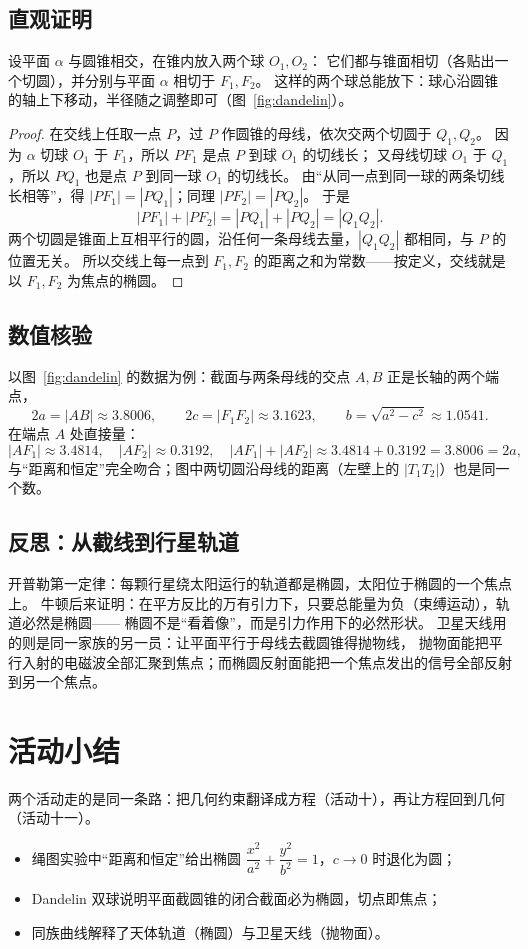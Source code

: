 \subsection{直观证明}
设平面 $\alpha$ 与圆锥相交，在锥内放入两个球 $O_1,O_2$：
它们都与锥面相切（各贴出一个切圆），并分别与平面 $\alpha$ 相切于 $F_1,F_2$。
这样的两个球总能放下：球心沿圆锥的轴上下移动，半径随之调整即可（图~\ref{fig:dandelin}）。

\begin{proof}
在交线上任取一点 $P$，过 $P$ 作圆锥的母线，依次交两个切圆于 $Q_1,Q_2$。
因为 $\alpha$ 切球 $O_1$ 于 $F_1$，所以 $PF_1$ 是点 $P$ 到球 $O_1$ 的切线长；
又母线切球 $O_1$ 于 $Q_1$，所以 $PQ_1$ 也是点 $P$ 到同一球 $O_1$ 的切线长。
由“从同一点到同一球的两条切线长相等”，得 $|PF_1|=|PQ_1|$；同理 $|PF_2|=|PQ_2|$。
于是
\[
  |PF_1|+|PF_2|=|PQ_1|+|PQ_2|=|Q_1Q_2|.
\]
两个切圆是锥面上互相平行的圆，沿任何一条母线去量，$|Q_1Q_2|$ 都相同，与 $P$ 的位置无关。
所以交线上每一点到 $F_1,F_2$ 的距离之和为常数——按定义，交线就是以 $F_1,F_2$ 为焦点的椭圆。
\end{proof}

\subsection{数值核验}
以图~\ref{fig:dandelin} 的数据为例：截面与两条母线的交点 $A,B$ 正是长轴的两个端点，
\[
  2a=|AB|\approx3.8006,\qquad 2c=|F_1F_2|\approx3.1623,\qquad
  b=\sqrt{a^2-c^2}\approx1.0541.
\]
在端点 $A$ 处直接量：
\[
  |AF_1|\approx3.4814,\quad |AF_2|\approx0.3192,\quad
  |AF_1|+|AF_2|\approx3.4814+0.3192=3.8006=2a,
\]
与“距离和恒定”完全吻合；图中两切圆沿母线的距离（左壁上的 $|T_1T_2|$）也是同一个数。

\subsection{反思：从截线到行星轨道}
开普勒第一定律：每颗行星绕太阳运行的轨道都是椭圆，太阳位于椭圆的一个焦点上。
牛顿后来证明：在平方反比的万有引力下，只要总能量为负（束缚运动），轨道必然是椭圆——
椭圆不是“看着像”，而是引力作用下的必然形状。
卫星天线用的则是同一家族的另一员：让平面平行于母线去截圆锥得抛物线，
抛物面能把平行入射的电磁波全部汇聚到焦点；而椭圆反射面能把一个焦点发出的信号全部反射到另一个焦点。


\section{活动小结}
两个活动走的是同一条路：把几何约束翻译成方程（活动十），再让方程回到几何（活动十一）。
\begin{itemize}
  \item 绳图实验中“距离和恒定”给出椭圆 $\dfrac{x^2}{a^2}+\dfrac{y^2}{b^2}=1$，$c\to0$ 时退化为圆；
  \item Dandelin 双球说明平面截圆锥的闭合截面必为椭圆，切点即焦点；
  \item 同族曲线解释了天体轨道（椭圆）与卫星天线（抛物面）。
\end{itemize}
